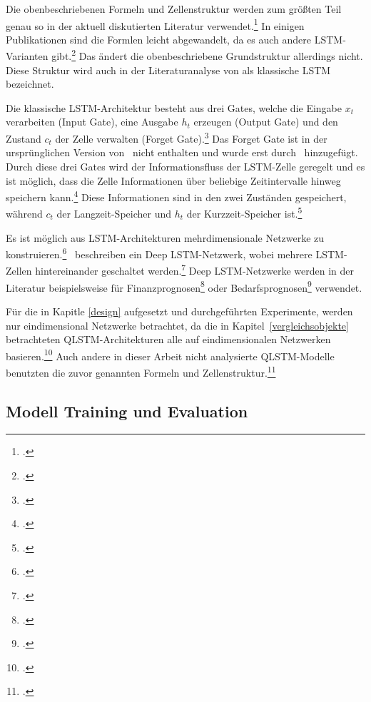 Die obenbeschriebenen Formeln und Zellenstruktur werden zum größten Teil genau so in der aktuell diskutierten Literatur verwendet.\footcite[Vgl.][]{Chen2022, Yu2023, Qi2021, Yan2018, Fischer2018, Liu2019, Sak2014, Sagheer2019}
In einigen Publikationen sind die Formlen leicht abgewandelt, da es auch andere \ac{LSTM}-Varianten gibt.\footcite[Vgl.][S. 5931f.]{VanHoudt2020} Das ändert die obenbeschriebene Grundstruktur allerdings nicht. Diese Struktur wird auch in der Literaturanalyse von \cite{VanHoudt2020} als klassische \ac{LSTM} bezeichnet.

Die klassische \ac{LSTM}-Architektur besteht aus drei Gates, welche die Eingabe $x_t$ verarbeiten (Input Gate), eine Ausgabe $h_t$ erzeugen (Output Gate) und den Zustand $c_t$ der Zelle verwalten (Forget Gate).\footcite[Vgl.][S. 5932]{VanHoudt2020}
Das Forget Gate ist in der ursprünglichen Version von~\cite{Hochreiter1997} nicht enthalten und wurde erst durch~\cite{Gers2000} hinzugefügt.
Durch diese drei Gates wird der Informationsfluss der \ac{LSTM}-Zelle geregelt und es ist möglich, dass die Zelle Informationen über beliebige Zeitintervalle hinweg speichern kann.\footcite[Vgl.][S. 5931]{VanHoudt2020}
Diese Informationen sind in den zwei Zuständen gespeichert, während $c_t$ der Langzeit-Speicher und $h_t$ der Kurzzeit-Speicher ist.\footcite[Vgl.][S. 5932f.]{VanHoudt2020}




Es ist möglich aus \ac{LSTM}-Architekturen mehrdimensionale Netzwerke zu konstruieren.\footcite[Vgl.][]{Sak2014}~\cite{Sagheer2019} beschreiben ein Deep \ac{LSTM}-Netzwerk, wobei mehrere \ac{LSTM}-Zellen hintereinander geschaltet werden.\footcite[Vgl.][S. 206]{Sagheer2019}
Deep \ac{LSTM}-Netzwerke werden in der Literatur beispielsweise für Finanzprognosen\footcite[Vgl.][]{Liu2019, Fischer2018, Yan2018} oder Bedarfsprognosen\footcite[Vgl.][]{Rodrigues2019} verwendet.

Für die in Kapitle \ref{design} aufgesetzt und durchgeführten Experimente, werden nur eindimensional Netzwerke betrachtet, da die in Kapitel~\ref{vergleichsobjekte} betrachteten \ac{QLSTM}-Architekturen alle auf eindimensionalen Netzwerken basieren.\footcite[Vgl.][]{Chen2022, Yu2023,Qi2021}
Auch andere in dieser Arbeit nicht analysierte \ac{QLSTM}-Modelle benutzten die zuvor genannten Formeln und Zellenstruktur.\footcite[Vgl.][]{Cao2023}



\subsection{Modell Training und Evaluation}\label{trainTest}

